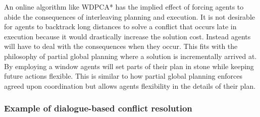 An online algorithm like WDPCA* has the implied effect of forcing agents to 
abide the consequences of interleaving planning and execution. It is not 
desirable for agents to backtrack long distances to solve a conflict that 
occurs late in execution because it would drastically increase the solution 
cost. Instead agents will have to deal with the consequences when they occur. 
This fits with the philosophy of partial global planning where a solution is 
incrementally arrived at. By employing a window agents will set parts of their 
plan in stone while keeping future actions flexible. This is similar to how 
partial global planning enforces agreed upon coordination but allows agents 
flexibility in the details of their plan.

\subsubsection{Example of dialogue-based conflict resolution}
